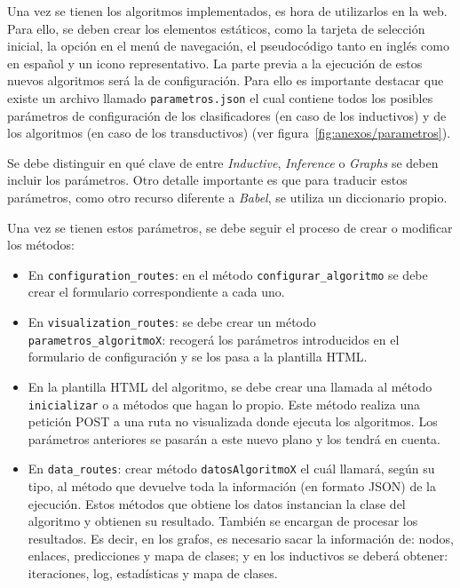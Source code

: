 Una vez se tienen los algoritmos implementados, es hora de utilizarlos en la web. Para ello, se deben crear los elementos estáticos, como la tarjeta de selección inicial, la opción en el menú de navegación, el pseudocódigo tanto en inglés como en español y un icono representativo. La parte previa a la ejecución de estos nuevos algoritmos será la de configuración. Para ello es importante destacar que existe un archivo llamado \texttt{parametros.json} el cual contiene todos los posibles parámetros de configuración de los clasificadores (en caso de los inductivos) y de los algoritmos (en caso de los transductivos) (ver figura~\ref{fig:anexos/parametros}).


Se debe distinguir en qué clave de entre \textit{Inductive}, \textit{Inference} o \textit{Graphs} se deben incluir los parámetros. Otro detalle importante es que para traducir estos parámetros, como otro recurso diferente a \textit{Babel}, se utiliza un diccionario propio.

Una vez se tienen estos parámetros, se debe seguir el proceso de crear o modificar los métodos:
\begin{itemize}
	\item En \texttt{configuration\_routes}: en el método \texttt{configurar\_algoritmo} se debe crear el formulario correspondiente a cada uno.
	\item  En \texttt{visualization\_routes}: se debe crear un método \texttt{parametros\_algoritmoX}: recogerá los parámetros introducidos en el formulario de configuración y se los pasa a la plantilla HTML.
	\item En la plantilla HTML del algoritmo, se debe crear una llamada al método \texttt{inicializar} o a métodos que hagan lo propio. Este método realiza una petición POST a una ruta no visualizada donde ejecuta los algoritmos. Los parámetros anteriores se pasarán a este nuevo plano y los tendrá en cuenta.
	\item En \texttt{data\_routes}: crear método \texttt{datosAlgoritmoX} el cuál llamará, según su tipo, al método que devuelve toda la información (en formato JSON) de la ejecución. Estos métodos que obtiene los datos instancian la clase del algoritmo y obtienen su resultado. También se encargan de procesar los resultados. Es decir, en los grafos, es necesario sacar la información de: nodos, enlaces, predicciones y mapa de clases; y en los inductivos se deberá obtener: iteraciones, log, estadísticas y mapa de clases.
\end{itemize}


